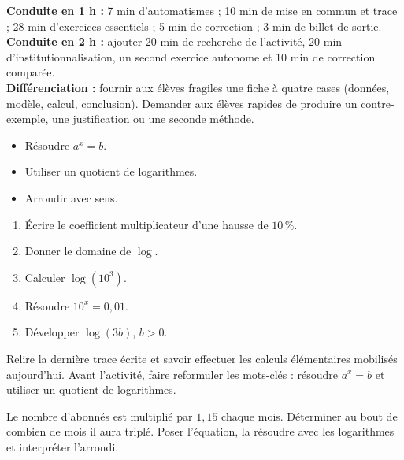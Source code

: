 \ifprof
\begin{methode}
\textbf{Conduite en 1 h :} 7 min d'automatismes ; 10 min de mise en commun et trace ; 28 min d'exercices essentiels ; 5 min de correction ; 3 min de billet de sortie.\\
\textbf{Conduite en 2 h :} ajouter 20 min de recherche de l'activité, 20 min d'institutionnalisation, un second exercice autonome et 10 min de correction comparée.\\
\textbf{Différenciation :} fournir aux élèves fragiles une fiche à quatre cases (données, modèle, calcul, conclusion). Demander aux élèves rapides de produire un contre-exemple, une justification ou une seconde méthode.
\end{methode}
\fi
{}
\begin{objectifs}\begin{itemize}\item Résoudre $a^x=b$.\item Utiliser un quotient de logarithmes.\item Arrondir avec sens.\end{itemize}\end{objectifs}
\begin{automatismes}\begin{enumerate}\item Écrire le coefficient multiplicateur d'une hausse de $10\,\%$. \item Donner le domaine de $\log$. \rep{$]0,+\infty[$}\item Calculer $\log(10^3)$. \item Résoudre $10^x=0{,}01$. \item Développer $\log(3b)$, $b>0$. \end{enumerate}\end{automatismes}
\begin{prerequis}Relire la dernière trace écrite et savoir effectuer les calculs élémentaires mobilisés aujourd'hui. Avant l'activité, faire reformuler les mots-clés : résoudre $a^x=b$ et utiliser un quotient de logarithmes.\end{prerequis}

\begin{activite}
Le nombre d'abonnés est multiplié par $1{,}15$ chaque mois. Déterminer au bout de combien de mois il aura triplé. Poser l'équation, la résoudre avec les logarithmes et interpréter l'arrondi.

\end{activite}

